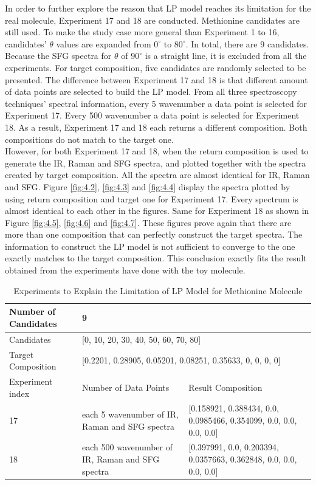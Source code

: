 In order to further explore the reason that LP model reaches its limitation for the real molecule, Experiment 17 and 18 are conducted. Methionine candidates are still used. To make the study case more general than Experiment 1 to 16, candidates' $\theta$ values are expanded from $0^{\circ}$ to $80^{\circ}$. In total, there are $9$ candidates. Because the SFG spectra for $\theta$ of $90^{\circ}$ is a straight line, it is excluded from all the experiments. For target composition, five candidates are randomly selected to be presented. The difference between Experiment 17 and 18 is that different amount of data points are selected to build the LP model. From all three spectroscopy techniques' spectral information, every 5 wavenumber a data point is selected for Experiment 17. Every 500 wavenumber a data point is selected for Experiment 18. As a result, Experiment 17 and 18 each returns a different composition. Both compositions do not match to the target one. \\

However, for both Experiment 17 and 18, when the return composition is used to generate the IR, Raman and SFG spectra, and plotted together with the spectra created by target composition. All the spectra are almost identical for IR, Raman and SFG. Figure \ref{fig:4.2}, \ref{fig:4.3} and \ref{fig:4.4} display the spectra plotted by using return composition and target one for Experiment 17. Every spectrum is almost identical to each other in the figures. Same for Experiment 18 as shown in Figure \ref{fig:4.5}, \ref{fig:4.6} and \ref{fig:4.7}. These figures prove again that there are more than one composition that can perfectly construct the target spectra. The information to construct the LP model is not sufficient to converge to the one exactly matches to the target composition. This conclusion exactly fits the result obtained from the experiments have done with the toy molecule.\\

\begin{table}\tiny 
\begin{center}
\begin{tabular}{| l | l | l | l }
\hline
Number of Candidates & \multicolumn{2}{l|}{9} \\ \hline
Candidates & \multicolumn{2}{l|}{[0, 10, 20, 30, 40, 50, 60, 70, 80]} \\ \hline
Target Composition & \multicolumn{2}{l|}{[0.2201, 0.28905, 0.05201, 0.08251, 0.35633, 0, 0, 0, 0]} \\ \hline
Experiment index & Number of Data Points & Result Composition \\ \hline
17 & each 5 wavenumber of IR, Raman and SFG spectra & [0.158921, 0.388434, 0.0, 0.0985466, 0.354099, 0.0, 0.0, 0.0, 0.0] \\ \hline
18 & each 500 wavenumber of IR, Raman and SFG spectra & [0.397991, 0.0, 0.203394, 0.0357663, 0.362848, 0.0, 0.0, 0.0, 0.0] \\ \hline
\end{tabular} 
\end{center}
\caption{Experiments to Explain the Limitation of LP Model for Methionine Molecule}
\label{tab:4.4}
\end{table}	

